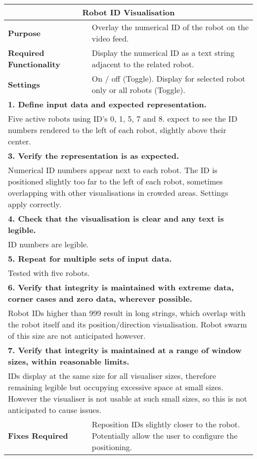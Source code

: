 \begin{longtable}{ l p{10cm} }
 \hline
 \multicolumn{2}{c}{\textbf{Robot ID Visualisation}}\\
 \hline
 \textbf{Purpose} & Overlay the numerical ID of the robot on the video feed.\\
 \textbf{Required Functionality} & Display the numerical ID as a text string adjacent to the related robot.\\
 \textbf{Settings} & On / off (Toggle). Display for selected robot only or all robots (Toggle).\\
 \hline
 \multicolumn{2}{p{14cm}}{\textbf{1. Define input data and expected representation.}}\\
 \multicolumn{2}{p{14cm}}{Five active robots using ID's 0, 1, 5, 7 and 8. expect to see the ID numbers rendered to the left of each robot, slightly above their center.}\\
 \hline
 \multicolumn{2}{p{14cm}}{\textbf{3. Verify the representation is as expected.}}\\
 \multicolumn{2}{p{14cm}}{Numerical ID numbers appear next to each robot. The ID is positioned slightly too far to the left of each robot, sometimes overlapping with other visualisations in crowded areas. Settings apply correctly.}\\
 \hline
 \multicolumn{2}{p{14cm}}{\textbf{4. Check that the visualisation is clear and any text is legible.}}\\
 \multicolumn{2}{p{14cm}}{ID numbers are legible.}\\
 \hline
 \multicolumn{2}{p{14cm}}{\textbf{5. Repeat for multiple sets of input data.}}\\
 \multicolumn{2}{p{14cm}}{Tested with five robots.}\\
 \hline
 \multicolumn{2}{p{14cm}}{\textbf{6. Verify that integrity is maintained with extreme data, corner cases and zero data, wherever possible.}}\\
 \multicolumn{2}{p{14cm}}{Robot IDs higher than 999 result in long strings, which overlap with the robot itself and its position/direction visualisation. Robot swarm of this size are not anticipated however.}\\
 \hline
 \multicolumn{2}{p{14cm}}{\textbf{7. Verify that integrity is maintained at a range of window sizes, within reasonable limits.}}\\
 \multicolumn{2}{p{14cm}}{IDs display at the same size for all visualiser sizes, therefore remaining legible but occupying excessive space at small sizes. However the visualiser is not usable at such small sizes, so this is not anticipated to cause issues.}\\
 \hline
 \textbf{Fixes Required} & Reposition IDs slightly closer to the robot. Potentially allow the user to configure the positioning.\\
 \bottomrule
\end{longtable}
\clearpage

